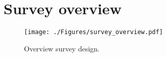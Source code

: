 
\onecolumn

\section{Survey overview}
\label{sec:appendix_survey_overview}

\begin{figure}[h]
  \centering
\texttt{[image: ./Figures/survey\_overview.pdf]}
\caption{Overview survey design.}
\label{fig:overview_survey}
\end{figure}
